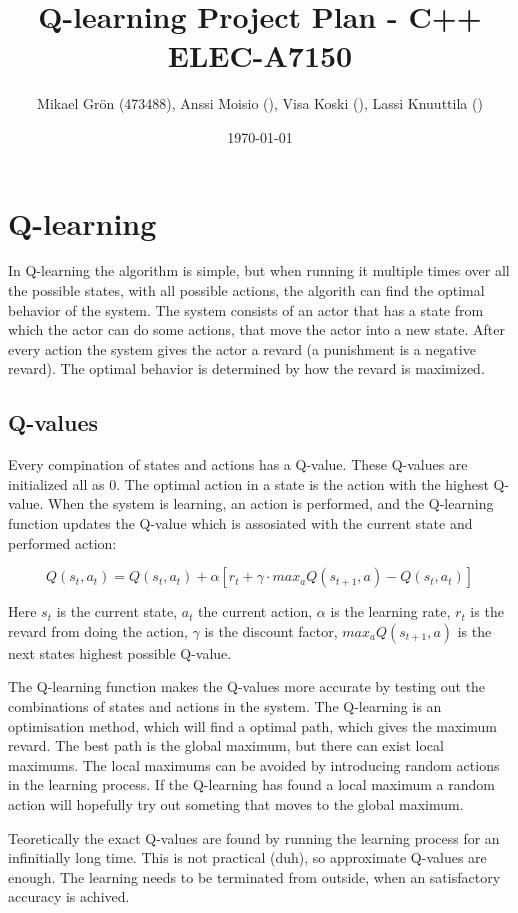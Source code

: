 \documentclass{article}
\author{Mikael Grön (473488), Anssi Moisio (),
    Visa Koski (), Lassi Knuuttila ()}
\title{Q-learning Project Plan - C++ ELEC-A7150}
\date{\today}
\begin{document}
\maketitle


\section{Q-learning}
In Q-learning the algorithm is simple, but when running it multiple times over
all the possible states, with all possible actions, the algorith can find the
optimal behavior of the system. The system consists of an actor that has a state
from which the actor can do some actions, that move the actor into a new state.
After every action the system gives the actor a revard (a punishment is a
negative revard). The optimal behavior is determined by how the revard is
maximized.


\subsection{Q-values}
Every compination of states and actions has a Q-value. These Q-values are
initialized all as 0. The optimal action in a state is the action with the
highest Q-value. When the system is learning, an action is performed, and the
Q-learning function updates the Q-value which is assosiated with the current
state and performed action:

\[Q(s_t, a_t) = Q(s_t, a_t) + \alpha [ r_t + \gamma \cdot max_aQ(s_{t+1}, a)
- Q(s_t, a_t) ]\]

Here $s_t$ is the current state, $a_t$ the current action,
$\alpha$ is the learning rate, $r_t$ is the revard from doing the action,
$\gamma$ is the discount factor, $max_aQ(s_{t+1}, a)$ is the next states
highest possible Q-value.

The Q-learning function makes the Q-values more accurate by testing out
the combinations of states and actions in the system. The Q-learning is an
optimisation method, which will find a optimal path, which gives the maximum
revard. The best path is the global maximum, but there can exist local maximums.
The local maximums can be avoided by introducing random actions in the learning
process. If the Q-learning has found a local maximum a random action will
hopefully try out someting that moves to the global maximum.

Teoretically the exact Q-values are found by running the learning process
for an infinitially long time. This is not practical (duh), so approximate
Q-values are enough. The learning needs to be terminated from outside, when an
satisfactory accuracy is achived.
\end{document}
